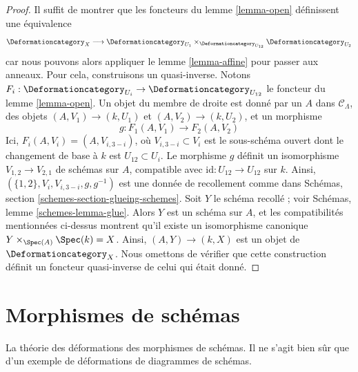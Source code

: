 \begin{proof}
Il suffit de montrer que les foncteurs du lemme \ref{lemma-open}
définissent une équivalence
$$
\Deformationcategory_X \longrightarrow
\Deformationcategory_{U_1}
\times_{\Deformationcategory_{U_{12}}}
\Deformationcategory_{U_2}
$$
car nous pouvons alors appliquer le lemme \ref{lemma-affine} pour passer aux anneaux.
Pour cela, construisons un quasi-inverse. Notons
$F_i : \Deformationcategory_{U_i} \to \Deformationcategory_{U_{12}}$
le foncteur du lemme \ref{lemma-open}.
Un objet du membre de droite est donné par un $A$ dans $\mathcal{C}_\Lambda$,
des objets $(A, V_1) \to (k, U_1)$ et $(A, V_2) \to (k, U_2)$, et
un morphisme
$$
g : F_1(A, V_1) \to F_2(A, V_2)
$$
Ici, $F_i(A, V_i) = (A, V_{i, 3 - i})$, où $V_{i, 3 - i} \subset V_i$
est le sous-schéma ouvert dont le changement de base à $k$ est $U_{12} \subset U_i$.
Le morphisme $g$ définit un isomorphisme
$V_{1, 2} \to V_{2, 1}$ de schémas sur $A$, compatible
avec $\text{id} : U_{12} \to U_{12}$ sur $k$.
Ainsi, $(\{1, 2\}, V_i, V_{i, 3 - i}, g, g^{-1})$ est une donnée
de recollement comme dans Schémas, section \ref{schemes-section-glueing-schemes}.
Soit $Y$ le schéma recollé ; voir Schémas, lemme \ref{schemes-lemma-glue}.
Alors $Y$ est un schéma sur $A$, et les
compatibilités mentionnées ci-dessus montrent
qu'il existe un isomorphisme canonique
$Y \times_{\Spec(A)} \Spec(k) = X$.
Ainsi, $(A, Y) \to (k, X)$ est un objet de $\Deformationcategory_X$.
Nous omettons de vérifier que cette construction définit un foncteur
quasi-inverse de celui qui était donné.
\end{proof}






\section{Morphismes de schémas}
\label{section-schemes-morphisms}

\noindent
La théorie des déformations des morphismes de schémas.
Il ne s'agit bien sûr que d'un exemple de
déformations de diagrammes de schémas.

